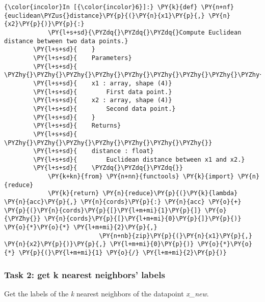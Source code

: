     \begin{Verbatim}[commandchars=\\\{\}]
{\color{incolor}In [{\color{incolor}6}]:} \PY{k}{def} \PY{n+nf}{euclidean\PYZus{}distance}\PY{p}{(}\PY{n}{x1}\PY{p}{,} \PY{n}{x2}\PY{p}{)}\PY{p}{:}
            \PY{l+s+sd}{\PYZdq{}\PYZdq{}\PYZdq{}Compute Euclidean distance between two data points.}
        \PY{l+s+sd}{    }
        \PY{l+s+sd}{    Parameters}
        \PY{l+s+sd}{    \PYZhy{}\PYZhy{}\PYZhy{}\PYZhy{}\PYZhy{}\PYZhy{}\PYZhy{}\PYZhy{}\PYZhy{}\PYZhy{}}
        \PY{l+s+sd}{    x1 : array, shape (4)}
        \PY{l+s+sd}{        First data point.}
        \PY{l+s+sd}{    x2 : array, shape (4)}
        \PY{l+s+sd}{        Second data point.}
        \PY{l+s+sd}{    }
        \PY{l+s+sd}{    Returns}
        \PY{l+s+sd}{    \PYZhy{}\PYZhy{}\PYZhy{}\PYZhy{}\PYZhy{}\PYZhy{}\PYZhy{}}
        \PY{l+s+sd}{    distance : float}
        \PY{l+s+sd}{        Euclidean distance between x1 and x2.}
        \PY{l+s+sd}{    \PYZdq{}\PYZdq{}\PYZdq{}}
            \PY{k+kn}{from} \PY{n+nn}{functools} \PY{k}{import} \PY{n}{reduce}
            \PY{k}{return} \PY{n}{reduce}\PY{p}{(}\PY{k}{lambda} \PY{n}{acc}\PY{p}{,} \PY{n}{cords}\PY{p}{:} \PY{n}{acc} \PY{o}{+} \PY{p}{(}\PY{n}{cords}\PY{p}{[}\PY{l+m+mi}{1}\PY{p}{]} \PY{o}{\PYZhy{}} \PY{n}{cords}\PY{p}{[}\PY{l+m+mi}{0}\PY{p}{]}\PY{p}{)} \PY{o}{*}\PY{o}{*} \PY{l+m+mi}{2}\PY{p}{,}
                          \PY{n+nb}{zip}\PY{p}{(}\PY{n}{x1}\PY{p}{,} \PY{n}{x2}\PY{p}{)}\PY{p}{,} \PY{l+m+mi}{0}\PY{p}{)} \PY{o}{*}\PY{o}{*} \PY{p}{(}\PY{l+m+mi}{1} \PY{o}{/} \PY{l+m+mi}{2}\PY{p}{)}
\end{Verbatim}

    \hypertarget{task-2-get-k-nearest-neighbors-labels}{%
\subsubsection{Task 2: get k nearest neighbors'
labels}\label{task-2-get-k-nearest-neighbors-labels}}

Get the labels of the \emph{k} nearest neighbors of the datapoint
\emph{x\_new}.


